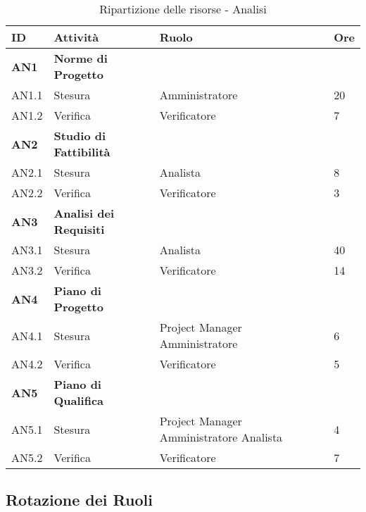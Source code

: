 \documentclass[12pt,a4paper]{article}
\begin{document}
\begin{table}
\begin{center}
\begin{tabular}{p{} p{} p{} p{}}
\toprule
\textbf{ID}	&	\textbf{Attività}	&	\textbf{Ruolo}	&	\textbf{Ore}\\
\midrule
\midrule
\textbf{AN1} & \textbf{Norme di Progetto} &  &  \\
\midrule
AN1.1 & Stesura & Amministratore & 20 \\
\midrule
AN1.2 & Verifica & Verificatore & 7 \\
\midrule
\textbf{AN2} & \textbf{Studio di Fattibilità} & & \\
\midrule
AN2.1 & Stesura & Analista & 8 \\
\midrule
AN2.2 & Verifica & Verificatore & 3 \\
\midrule
\textbf{AN3} & \textbf{Analisi dei Requisiti} & &  \\
\midrule
AN3.1 & Stesura & Analista & 40 \\
\midrule
AN3.2 & Verifica & Verificatore & 14 \\
\midrule
\textbf{AN4} & \textbf{Piano di Progetto} & &  \\
\midrule
AN4.1 & Stesura & Project Manager \newline Amministratore & 6 \newline 10 \\
\midrule
AN4.2 & Verifica & Verificatore & 5 \\
\midrule
\textbf{AN5} & \textbf{Piano di Qualifica} & & \\
\midrule
AN5.1 & Stesura & Project Manager \newline Amministratore \newline Analista & 4 \newline 8 \newline 8 \\
\midrule
AN5.2 & Verifica & Verificatore & 7 \\
\bottomrule
\end{tabular}
\caption{Ripartizione delle risorse - Analisi}
\end{center}
\end{table}

\subsection{Rotazione dei Ruoli}
\end{document}
